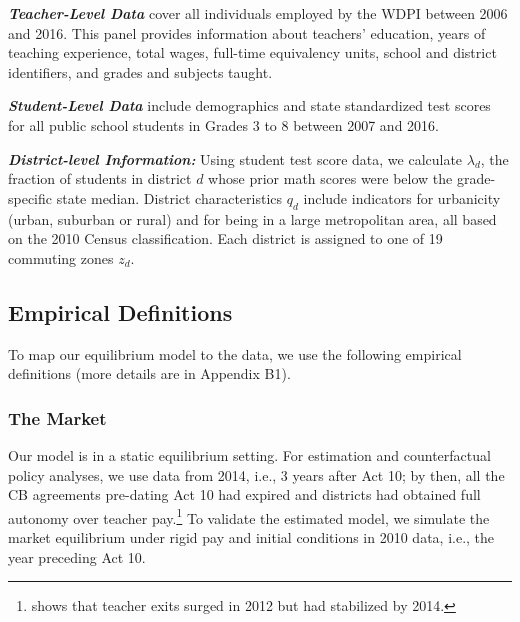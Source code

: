 \documentclass[notitlepage,12pt]{article}%
\begin{document}
\medskip\noindent\textit{\textbf{Teacher-Level Data}} \citep[PI-1202 Fall Staff
Report][]{wdpi_admin_2006_2016} cover all individuals employed by the WDPI between 2006 and 2016. This
panel provides information about teachers' education, years of teaching
experience, total wages, full-time equivalency units, school and district
identifiers, and grades and subjects taught.

\nocite{wdpi_cesa}
\nocite{wdpi_school_districts_2024}
\nocite{nces_school_district_boundaries}
\nocite{bergeron_etal_2022_life_expectancy_data}
\nocite{dailykos_county_cd_overlaps_117}
\nocite{google_maps_2022}

\medskip\noindent\textit{\textbf{Student-Level Data }}include demographics and
state standardized test scores for all public school students in Grades 3 to 8
between 2007 and 2016.

\medskip\noindent\textit{\textbf{District-level Information: }}Using student
test score data, we calculate $\lambda_{d}$, the fraction of students in
district $d$ whose prior math scores were below the grade-specific state
median. District characteristics $q_{d}$ include indicators for urbanicity
(urban, suburban or rural) and for being in a large metropolitan area, all
based on the 2010 Census classification. Each district is assigned to one of
19 commuting zones $z_{d}$.

\subsection{Empirical Definitions}

To map our equilibrium model to the data, we use the following empirical
definitions (more details are in Appendix B1).

\subsubsection{The Market\label{market}}

Our model is in a static equilibrium setting. For estimation and
counterfactual policy analyses, we use data from 2014, i.e., 3 years after Act
10; by then, all the CB agreements pre-dating Act 10 had expired and districts
had obtained full autonomy over teacher pay.\footnote{\citet{biasi2018labor}
shows that teacher exits surged in 2012 but had stabilized by 2014.} To
validate the estimated model, we simulate the market equilibrium under rigid
pay and initial conditions in 2010 data, i.e., the year preceding Act 10.
\end{document}

